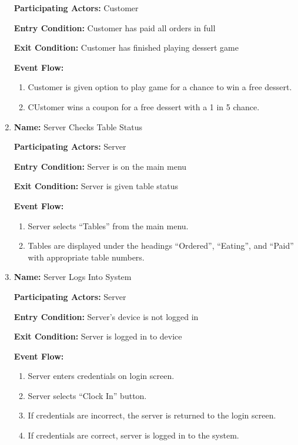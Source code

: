 \documentclass[11pt]{article}
\begin{document}
\begin{enumerate}
			\textbf{Participating Actors:} 	Customer

			\textbf{Entry Condition:} 		Customer has paid all orders in full

			\textbf{Exit Condition:} 		Customer has finished playing dessert game

			\textbf{Event Flow:}
			\begin{enumerate}
				\setlength{\leftskip}{1cm}
				\item Customer is given option to play game for a chance to win a free dessert.
				\item CUstomer wins a coupon for a free dessert with a 1 in 5 chance.\\
			\end{enumerate}

		\item \textbf{Name:} 				Server Checks Table Status

			\textbf{Participating Actors:} 	Server

			\textbf{Entry Condition:} 		Server is on the main menu

			\textbf{Exit Condition:} 		Server is given table status

			\textbf{Event Flow:}
			\begin{enumerate}
				\setlength{\leftskip}{1cm}
				\item Server selects “Tables” from the main menu.
				\item Tables are displayed under the headings “Ordered”, “Eating”, and “Paid” with appropriate table numbers.\\
			\end{enumerate}

		\item \textbf{Name:} 				Server Logs Into System

			\textbf{Participating Actors:} 	Server

			\textbf{Entry Condition:} 		Server's device is not logged in

			\textbf{Exit Condition:} 		Server is logged in to device

			\textbf{Event Flow:}
			\begin{enumerate}
				\setlength{\leftskip}{1cm}
				\item Server enters credentials on login screen.
				\item Server selects ``Clock In'' button.
				\item If credentials are incorrect, the server is returned to the login screen.
				\item If credentials are correct, server is logged in to the system.\\
			\end{enumerate}


\end{enumerate}
\end{document}
